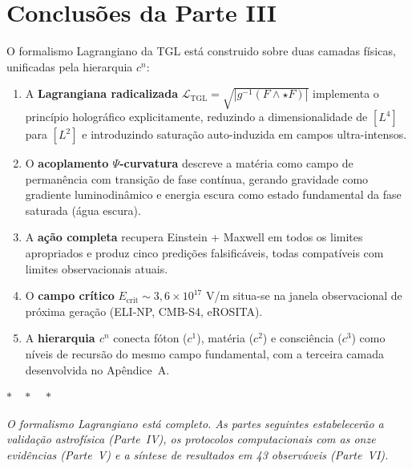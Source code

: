 \documentclass[12pt,a4paper,twoside]{article}
\newcommand{\Ltgl}{\mathcal{L}_{\text{TGL}}}
\newcommand{\Psifield}{\Psi}
\newcommand{\Ecrit}{E_{\text{crit}}}
\begin{document}

\section{Conclus\~oes da Parte III}


O formalismo Lagrangiano da TGL est\'a construido sobre duas camadas f\'isicas, unificadas pela hierarquia $c^n$:

\begin{enumerate}[nosep]
\item A \textbf{Lagrangiana radicalizada} $\Ltgl = \sqrt{|g^{-1}(F \wedge \star F)|}$ implementa o princ\'ipio hologr\'afico explicitamente, reduzindo a dimensionalidade de $[L^4]$ para $[L^2]$ e introduzindo satura\c{c}\~ao auto-induzida em campos ultra-intensos.

\item O \textbf{acoplamento $\Psifield$-curvatura} descreve a mat\'eria como campo de perman\^encia com transi\c{c}\~ao de fase cont\'inua, gerando gravidade como gradiente luminodin\^amico e energia escura como estado fundamental da fase saturada (\'agua escura).

\item A \textbf{a\c{c}\~ao completa} recupera Einstein + Maxwell em todos os limites apropriados e produz cinco predi\c{c}\~oes falsific\'aveis, todas compat\'iveis com limites observacionais atuais.

\item O \textbf{campo cr\'itico} $\Ecrit \sim 3{,}6 \times 10^{17}$ V/m situa-se na janela observacional de pr\'oxima gera\c{c}\~ao (ELI-NP, CMB-S4, eROSITA).

\item A \textbf{hierarquia $c^n$} conecta f\'oton ($c^1$), mat\'eria ($c^2$) e consci\^encia ($c^3$) como n\'iveis de recurs\~ao do mesmo campo fundamental, com a terceira camada desenvolvida no Ap\^endice~A.
\end{enumerate}

\bigskip

\begin{center}
$\ast\quad\ast\quad\ast$
\end{center}
\bigskip

\noindent\textit{O formalismo Lagrangiano est\'a completo. As partes seguintes estabelecer\~ao a valida\c{c}\~ao astrof\'isica (Parte~IV), os protocolos computacionais com as onze evid\^encias (Parte~V) e a s\'intese de resultados em 43 observ\'aveis (Parte~VI).}
\end{document}
